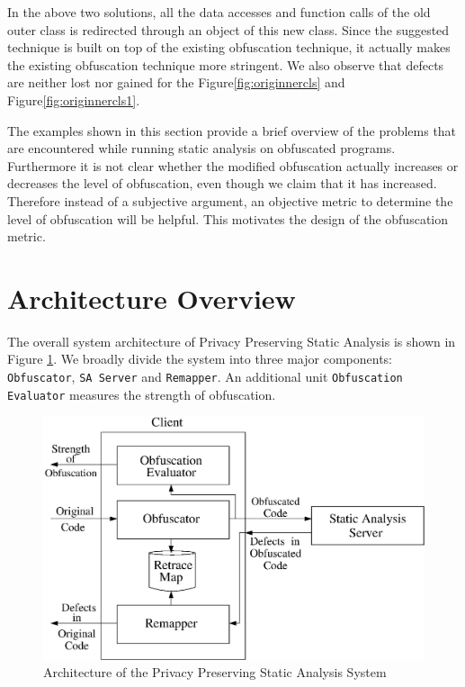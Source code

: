 \documentclass[conference]{IEEEtran}
\begin{document}
In the above two solutions, all the data accesses and function calls of the old outer class is redirected through an object of this new class. Since the suggested technique is built 
on top of the existing obfuscation technique, it actually makes the existing obfuscation technique more stringent. We also observe that defects are neither lost nor 
gained for the Figure\ref{fig:originnercls} and Figure\ref{fig:originnercls1}.

The examples shown in this section provide a brief overview of the problems that are encountered while running static analysis on obfuscated programs. Furthermore it is not clear 
whether the modified obfuscation actually increases or decreases the level of obfuscation, even though we claim that it has increased. Therefore instead of a subjective argument, 
an objective metric to determine the level of obfuscation will be helpful. This motivates the design of the obfuscation metric.
\section{Architecture Overview}
The overall system architecture of Privacy Preserving Static Analysis is shown in Figure \ref{fig:architecture}. We broadly divide the system into three major components: 
{\tt Obfuscator}, {\tt SA Server} and {\tt Remapper}. An additional unit {\tt Obfuscation Evaluator} measures the strength of obfuscation.

\begin{figure}[h]
 \centering
 \includegraphics[scale=0.4]{./architecture2.eps}
 \caption{Architecture of the Privacy Preserving Static Analysis System}
 \label{fig:architecture}
\end{figure}
\end{document}
